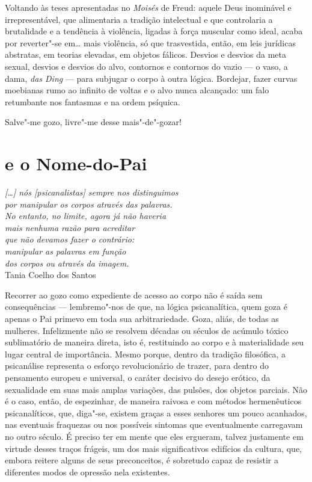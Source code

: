 Voltando às teses apresentadas no \emph{Moisés} de Freud: aquele Deus
inominável e irrepresentável, que alimentaria a tradição intelectual e
que controlaria a brutalidade e a tendência à violência, ligadas à força
muscular como ideal, acaba por reverter"-se em\ldots{} mais violência, só que
trasvestida, então, em leis jurídicas abstratas, em teorias elevadas, em
objetos fálicos. Desvios e desvios da meta sexual, desvios e desvios do
alvo, contornos e contornos do vazio --- o vaso, a dama, \emph{das Ding}
--- para subjugar o corpo à outra lógica. Bordejar, fazer curvas
moebianas rumo ao infinito de voltas e o alvo nunca alcançado: um falo
retumbante nos fantasmas e na ordem psíquica.

Salve"-me gozo, livre"-me desse mais"-de"-gozar!

\section{ e o Nome-do-Pai}

\begin{flushright}
\footnotesize
\emph{{[}\ldots{}{]} nós {[}psicanalistas{]} sempre nos distinguimos\\
por manipular os corpos através das palavras.\\
No entanto, no limite, agora já não haveria\\
mais nenhuma razão para acreditar \\
que não devamos fazer o contrário: \\
manipular as palavras em função \\
dos corpos ou através da imagem.}\\
Tania Coelho dos Santos
\end{flushright}

Recorrer ao gozo como expediente de acesso ao corpo não é saída sem
consequências --- lembremo"-nos de que, na lógica psicanalítica, quem goza
é apenas o Pai primevo em toda sua arbitrariedade. Goza, aliás, de todas
as mulheres. Infelizmente não se resolvem décadas ou séculos de acúmulo
tóxico sublimatório de maneira direta, isto é, restituindo ao corpo e à
materialidade seu lugar central de importância. Mesmo porque, dentro da
tradição filosófica, a psicanálise representa o esforço revolucionário
de trazer, para dentro do pensamento europeu e universal, o caráter
decisivo do desejo erótico, da sexualidade em suas mais amplas
variações, das pulsões, dos objetos parciais. Não é o caso, então, de
espezinhar, de maneira raivosa e com métodos hermenêuticos
psicanalíticos, que, diga"-se, existem graças a esses senhores um pouco
acanhados, nas eventuais fraquezas ou nos possíveis sintomas que
eventualmente carregavam no outro século. É preciso ter em mente que
eles ergueram, talvez justamente em virtude desses traços frágeis, um
dos mais significativos edifícios da cultura, que, embora reitere alguns
de seus preconceitos, é sobretudo capaz de resistir a diferentes modos
de opressão nela existentes.

